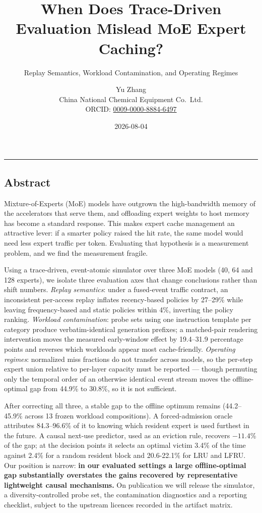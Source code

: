 \documentclass[
  10pt,
  letterpaper,
  10pt]{article}
\title{When Does Trace-Driven Evaluation Mislead MoE Expert Caching?}
\subtitle{Replay Semantics, Workload Contamination, and Operating
Regimes}
\author{Yu Zhang \orcidlink{0009-0000-8884-6497}\\
China National Chemical Equipment Co.~Ltd.\\
ORCID:
\href{https://orcid.org/0009-0000-8884-6497}{0009-0000-8884-6497}}
\date{2026-08-04}
\begin{document}
\maketitle

\begin{center}\rule{0.5\linewidth}{0.5pt}\end{center}

\subsection{Abstract}\label{abstract}

Mixture-of-Experts (MoE) models have outgrown the high-bandwidth memory
of the accelerators that serve them, and offloading expert weights to
host memory has become a standard response. This makes expert cache
management an attractive lever: if a smarter policy raised the hit rate,
the same model would need less expert traffic per token. Evaluating that
hypothesis is a measurement problem, and we find the measurement
fragile.

Using a trace-driven, event-atomic simulator over three MoE models (40,
64 and 128 experts), we isolate three evaluation axes that change
conclusions rather than shift numbers. \emph{Replay semantics}: under a
fused-event traffic contract, an inconsistent per-access replay inflates
recency-based policies by 27--29\% while leaving frequency-based and
static policies within 4\%, inverting the policy ranking. \emph{Workload
contamination}: probe sets using one instruction template per category
produce verbatim-identical generation prefixes; a matched-pair rendering
intervention moves the measured early-window effect by 19.4--31.9
percentage points and reverses which workloads appear most
cache-friendly. \emph{Operating regimes}: normalized miss fractions do
not transfer across models, so the per-step expert union relative to
per-layer capacity must be reported --- though permuting only the
temporal order of an otherwise identical event stream moves the
offline-optimal gap from 44.9\% to 30.8\%, so it is not sufficient.

After correcting all three, a stable gap to the offline optimum remains
(44.2--45.9\% across 13 frozen workload compositions). A
forced-admission oracle attributes 84.3--96.6\% of it to knowing which
resident expert is used furthest in the future. A causal next-use
predictor, used as an eviction rule, recovers \(-11.4\)\% of the gap; at
the decision points it selects an optimal victim 3.4\% of the time
against 2.4\% for a random resident block and 20.6-22.1\% for LRU and
LFRU. Our position is narrow: \textbf{in our evaluated settings a large
offline-optimal gap substantially overstates the gains recovered by
representative lightweight causal mechanisms.} On publication we will
release the simulator, a diversity-controlled probe set, the
contamination diagnostics and a reporting checklist, subject to the
upstream licences recorded in the artifact matrix.
\end{document}

